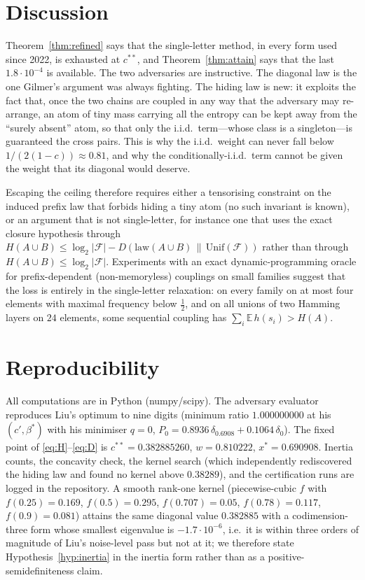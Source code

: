 \documentclass[11pt]{article}
\theoremstyle{definition}
\newcommand{\E}{\mathbb{E}}
\newcommand{\F}{\mathcal{F}}
\newcommand{\ent}{h}
\begin{document}
\section{Discussion}
Theorem~\ref{thm:refined} says that the single-letter method, in every form used since 2022, is exhausted at $c^{**}$, and Theorem~\ref{thm:attain} says that the last $1.8\cdot10^{-4}$ is available. The two adversaries are instructive. The diagonal law is the one Gilmer's argument was always fighting. The hiding law is new: it exploits the fact that, once the two chains are coupled in any way that the adversary may re-arrange, an atom of tiny mass carrying all the entropy can be kept away from the ``surely absent'' atom, so that only the i.i.d.\ term---whose class is a singleton---is guaranteed the cross pairs. This is why the i.i.d.\ weight can never fall below $1/(2(1-c))\approx0.81$, and why the conditionally-i.i.d.\ term cannot be given the weight that its diagonal would deserve.

Escaping the ceiling therefore requires either a tensorising constraint on the induced prefix law that forbids hiding a tiny atom (no such invariant is known), or an argument that is not single-letter, for instance one that uses the exact closure hypothesis through $H(A\cup B)\le\log_2|\F|-D(\mathrm{law}(A\cup B)\,\|\,\mathrm{Unif}(\F))$ rather than through $H(A\cup B)\le\log_2|\F|$. Experiments with an exact dynamic-programming oracle for prefix-dependent (non-memoryless) couplings on small families suggest that the loss is entirely in the single-letter relaxation: on every family on at most four elements with maximal frequency below $\frac12$, and on all unions of two Hamming layers on $24$ elements, some sequential coupling has $\sum_i\E\,\ent(s_i)>H(A)$.

\section{Reproducibility}\label{sec:repro}
All computations are in Python (numpy/scipy). The adversary evaluator reproduces Liu's optimum to nine digits (minimum ratio $1.000000000$ at his $(c',\beta^*)$ with his minimiser $q=0$, $P_0=0.8936\,\delta_{0.6908}+0.1064\,\delta_0$). The fixed point of \eqref{eq:H}--\eqref{eq:D} is $c^{**}=0.382885260$, $w=0.810222$, $x^*=0.690908$. Inertia counts, the concavity check, the kernel search (which independently rediscovered the hiding law and found no kernel above $0.38289$), and the certification runs are logged in the repository. A smooth rank-one kernel (piecewise-cubic $f$ with $f(0.25)=0.169$, $f(0.5)=0.295$, $f(0.707)=0.05$, $f(0.78)=0.117$, $f(0.9)=0.081$) attains the same diagonal value $0.382885$ with a codimension-three form whose smallest eigenvalue is $-1.7\cdot10^{-6}$, i.e.\ it is within three orders of magnitude of Liu's noise-level pass but not at it; we therefore state Hypothesis~\ref{hyp:inertia} in the inertia form rather than as a positive-semidefiniteness claim.
\end{document}
